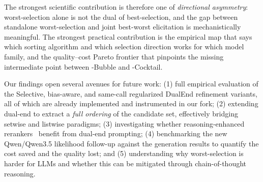 The strongest scientific contribution is therefore one of \emph{directional asymmetry}: worst-selection alone is not the dual of best-selection, and the gap between standalone worst-selection and joint best-worst elicitation is mechanistically meaningful. The strongest practical contribution is the empirical map that says which sorting algorithm and which selection direction works for which model family, and the quality--cost Pareto frontier that pinpoints the missing intermediate point between \topdown{}-Bubble and \dualend{}-Cocktail.

Our findings open several avenues for future work: (1) full empirical evaluation of the Selective, bias-aware, and same-call regularized DualEnd refinement variants, all of which are already implemented and instrumented in our fork; (2) extending dual-end to extract a \emph{full ordering} of the candidate set, effectively bridging setwise and listwise paradigms; (3) investigating whether reasoning-enhanced rerankers~\citep{zhuang2025rankr1} benefit from dual-end prompting; (4) benchmarking the new Qwen/Qwen3.5 likelihood follow-up against the generation results to quantify the cost saved and the quality lost; and (5) understanding why worst-selection is harder for LLMs and whether this can be mitigated through chain-of-thought reasoning.

